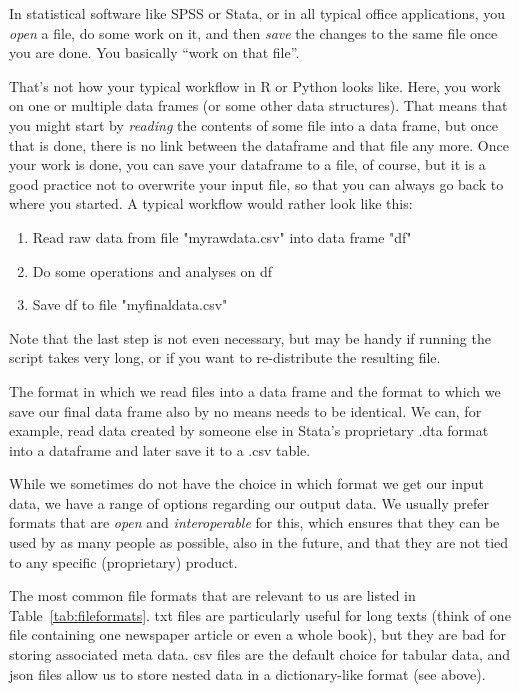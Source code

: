 In statistical software like SPSS or Stata, or in all typical office applications, you \emph{open} a file, do some work on it, and then \emph{save} the changes to the same file once you are done. You basically ``work on that file''.

That's not how your typical workflow in R or Python looks like. Here, you work on one or multiple data frames (or some other data structures). That means that you might start by \emph{reading} the contents of some file into a data frame, but once that is done, there is no link between the dataframe and that file any more. Once your work is done, you can save your dataframe to a file, of course, but it is a good practice not to overwrite your input file, so that you can always go back to where you started. A typical workflow would rather look like this:
\begin{enumerate}
\item Read raw data from file "myrawdata.csv" into data frame "df"
\item Do some operations and analyses on df
\item Save df to file "myfinaldata.csv"
\end{enumerate}
Note that the last step is not even necessary, but may be handy if running the script takes very long, or if you want to re-distribute the resulting file.

The format in which we read files into a data frame and the format to which we save our final data frame also by no means needs to be identical. We can, for example, read data created by someone else in Stata's proprietary .dta format into a dataframe and later save it to a .csv table.

While we sometimes do not have the choice in which format we get our input data, we have a range of options regarding our output data. We usually prefer formats that are \emph{open} and \emph{interoperable} for this, which ensures that they can be used by as many people as possible, also in the future, and that they are not tied to any specific (proprietary) product.

The most common file formats that are relevant to us are listed in Table~\ref{tab:fileformats}. txt files are particularly useful for long texts (think of one file containing one newspaper article or even a whole book), but they are bad for storing associated meta data. csv files are the default choice for tabular data, and json files allow us to store nested data in a dictionary-like format (see above). 

